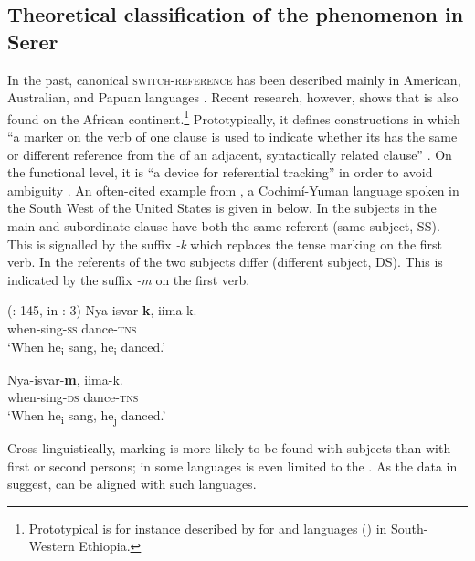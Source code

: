 \documentclass[output=paper,newtxmath,modfonts,nonflat,hidelinks]{langsci/langscibook}
\begin{document}
\subsection{Theoretical classification of the phenomenon in Serer}\label{sec:apel:3.1}

In the past, canonical \textsc{switch-reference} has been described mainly in American, Australian, and Papuan languages \citep{HaimanMunro83}. Recent research, however, shows that  is also found on the African continent.\footnote{Prototypical  is for instance described by \citet{Treis2012} for  and  languages () in South-Western Ethiopia.}  Prototypically, it defines constructions in which “a marker on the verb of one clause is used to indicate whether its  has the same or different reference from the  of an adjacent, syntactically related clause” \citep[1]{Stirling1993}. On the functional level, it is “a device for referential tracking” in order to avoid ambiguity \citep[xi]{HaimanMunro83}. An often-cited example from , a Cochimí-Yuman language spoken in the South West of the United States is given in  below. In  the subjects in the main and subordinate clause have both the same referent (same subject, SS). This is signalled by the suffix \textit{-k} which replaces the tense marking on the first verb. In  the referents of the two subjects differ (different subject, DS). This is indicated by the suffix \textit{-m} on the first verb.

\ea\label{ex:apel:18}
{ (\citealt{Munro1980}: 145, in \citealt{Stirling1993}: 3)}
\ea\label{ex:apel:18a}
\gll   Nya-isvar-\textbf{k}, iima-k.\\
     when\textsc{-}sing\textsc{-ss} dance\textsc{-tns} \\
\glt ‘When he\textsubscript{i} sang, he\textsubscript{i} danced.’

\ex\label{ex:apel:18b}
\gll Nya-isvar-\textbf{m}, iima-k.\\
     when\textsc{-}sing\textsc{-ds} dance\textsc{-tns} \\
\glt ‘When he\textsubscript{i} sang, he\textsubscript{j} danced.’
\z
\z

Cross-linguistically,  marking is more likely to be found with  subjects than with first or second persons; in some languages  is even limited to the  \citep[xi]{HaimanMunro83}. As the data in  suggest,  can be aligned with such languages.
\end{document}
